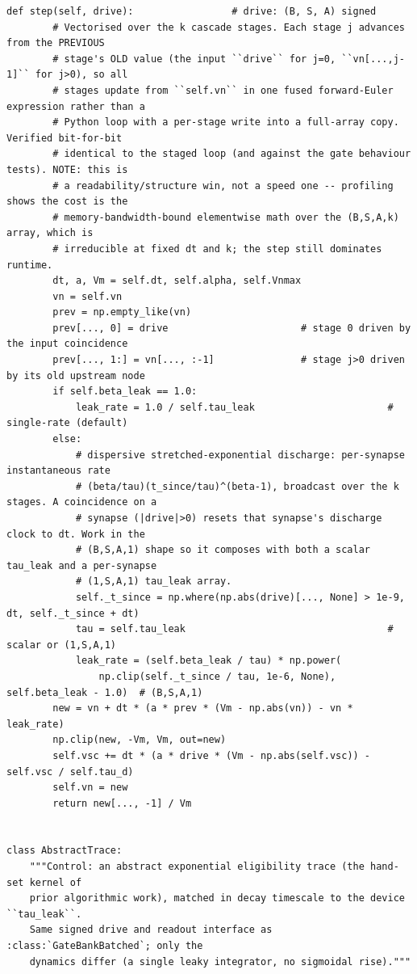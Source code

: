 \begin{lstlisting}[caption={mrl\_trace/bandit.py},label={lst:siox-src-bandit}]
    def step(self, drive):                 # drive: (B, S, A) signed
        # Vectorised over the k cascade stages. Each stage j advances from the PREVIOUS
        # stage's OLD value (the input ``drive`` for j=0, ``vn[...,j-1]`` for j>0), so all
        # stages update from ``self.vn`` in one fused forward-Euler expression rather than a
        # Python loop with a per-stage write into a full-array copy. Verified bit-for-bit
        # identical to the staged loop (and against the gate behaviour tests). NOTE: this is
        # a readability/structure win, not a speed one -- profiling shows the cost is the
        # memory-bandwidth-bound elementwise math over the (B,S,A,k) array, which is
        # irreducible at fixed dt and k; the step still dominates runtime.
        dt, a, Vm = self.dt, self.alpha, self.Vnmax
        vn = self.vn
        prev = np.empty_like(vn)
        prev[..., 0] = drive                       # stage 0 driven by the input coincidence
        prev[..., 1:] = vn[..., :-1]               # stage j>0 driven by its old upstream node
        if self.beta_leak == 1.0:
            leak_rate = 1.0 / self.tau_leak                       # single-rate (default)
        else:
            # dispersive stretched-exponential discharge: per-synapse instantaneous rate
            # (beta/tau)(t_since/tau)^(beta-1), broadcast over the k stages. A coincidence on a
            # synapse (|drive|>0) resets that synapse's discharge clock to dt. Work in the
            # (B,S,A,1) shape so it composes with both a scalar tau_leak and a per-synapse
            # (1,S,A,1) tau_leak array.
            self._t_since = np.where(np.abs(drive)[..., None] > 1e-9, dt, self._t_since + dt)
            tau = self.tau_leak                                   # scalar or (1,S,A,1)
            leak_rate = (self.beta_leak / tau) * np.power(
                np.clip(self._t_since / tau, 1e-6, None), self.beta_leak - 1.0)  # (B,S,A,1)
        new = vn + dt * (a * prev * (Vm - np.abs(vn)) - vn * leak_rate)
        np.clip(new, -Vm, Vm, out=new)
        self.vsc += dt * (a * drive * (Vm - np.abs(self.vsc)) - self.vsc / self.tau_d)
        self.vn = new
        return new[..., -1] / Vm


class AbstractTrace:
    """Control: an abstract exponential eligibility trace (the hand-set kernel of
    prior algorithmic work), matched in decay timescale to the device ``tau_leak``.
    Same signed drive and readout interface as :class:`GateBankBatched`; only the
    dynamics differ (a single leaky integrator, no sigmoidal rise)."""


\end{lstlisting}
